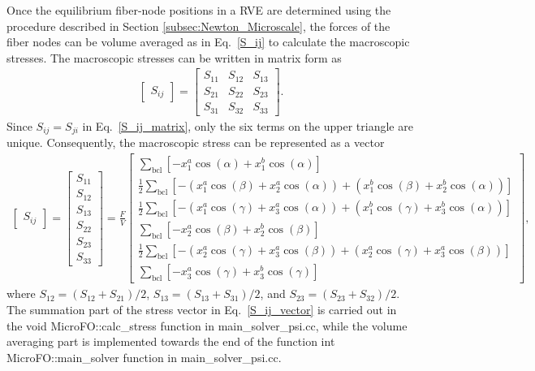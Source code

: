 \documentclass[12pt,aps,pre]{revtex4}
\begin{document}
Once the equilibrium fiber-node positions in a RVE are determined using the procedure described in Section \ref{subsec:Newton_Microscale}, the forces of the fiber nodes can be volume averaged as in Eq.\ \eqref{S_ij} to calculate the macroscopic stresses. The macroscopic stresses can be written in matrix form as
%
\begin{eqnarray}
\begin{bmatrix}
S_{ij}
\end{bmatrix} = 
%
\begin{bmatrix}
S_{11} & S_{12} & S_{13} \\
S_{21} & S_{22} & S_{23} \\
S_{31} & S_{32} & S_{33} 
\end{bmatrix} .
\label{S_ij_matrix}
\end{eqnarray}
%
Since $S_{ij} = S_{ji}$ in Eq.\ \eqref{S_ij_matrix}, only the six terms on the upper triangle are unique. Consequently, the macroscopic stress can be represented as a vector
%
\begin{eqnarray}
\begin{bmatrix}
S_{ij}
\end{bmatrix} = 
%
\begin{bmatrix}
S_{11} \\ S_{12} \\ S_{13} \\ S_{22} \\ S_{23} \\ S_{33} 
\end{bmatrix} =
%
\frac{F}{V} \begin{bmatrix}
\sum_{\text{bcl}} \left[ - x^a_1  \cos(\alpha) + x^b_1 \cos(\alpha) \right] \\ 
%
\frac{1}{2}\sum_{\text{bcl}}  \left[-\left( x^a_1  \cos(\beta)+ x^a_2 \cos(\alpha) \right) + \left( x^b_1  \cos(\beta)+ x^b_2 \cos(\alpha) \right) \right] \\ 
%
\frac{1}{2}\sum_{\text{bcl}} \left[ -\left(x^a_1 \cos(\gamma) + x^a_3 \cos(\alpha) \right) + \left(x^b_1 \cos(\gamma) + x^b_3 \cos(\alpha) \right) \right] \\ 
%
\sum_{\text{bcl}} \left[-x^a_2 \cos(\beta) + x^b_2 \cos(\beta) \right]\\
%
\frac{1}{2} \sum_{\text{bcl}} \left[-\left(x^a_2 \cos(\gamma) + x^a_3 \cos(\beta) \right) + \left(x^a_2 \cos(\gamma) + x^a_3 \cos(\beta) \right)\right] \\
%
\sum_{\text{bcl}} \left[ -x^a_3 \cos(\gamma) + x^b_3 \cos(\gamma) \right]
\end{bmatrix}  ,
\label{S_ij_vector}
\end{eqnarray}
%
where $S_{12} = (S_{12}+S_{21})/2$, $S_{13} = (S_{13}+S_{31})/2$, and $S_{23} = (S_{23}+S_{32})/2$. The summation part of the stress vector in Eq.\ \eqref{S_ij_vector} is carried out in the void MicroFO::calc\_stress function in main\_solver\_psi.cc, while the volume averaging part is implemented towards the end of the function int MicroFO::main\_solver function in main\_solver\_psi.cc.
\end{document}
